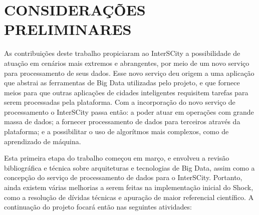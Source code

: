 \chapter{CONSIDERAÇÕES PRELIMINARES}
\label{chapter:final}

As contribuições deste trabalho propiciaram ao InterSCity a possibilidade de
atuação em cenários mais extremos e abrangentes, por meio de um novo serviço
para processamento de seus dados. Esse novo serviço deu origem a uma aplicação
que abstrai as ferramentas de Big Data utilizadas pelo projeto, e que fornece
meios para que outras aplicações de cidades inteligentes requisitem tarefas para
serem processadas pela plataforma. Com a incorporação do novo serviço de
processamento o InterSCity passa então: a poder atuar em operações com grande
massa de dados; a fornecer processamento de dados para terceiros através da
plataforma; e a possibilitar o uso de algorítmos mais complexos, como de
aprendizado de máquina.

Esta primeira etapa do trabalho começou em março, e envolveu a revisão
bibliográfica e técnica sobre arquiteturas e tecnologias de Big Data, assim
como a concepção do serviço de processamento de dados para o InterSCity.
Portanto, ainda existem várias melhorias a serem feitas na implementação
inicial do Shock, como a resolução de dívidas técnicas e apuração de maior
referencial científico. A continuação do projeto focará então nas seguintes
atividades:

